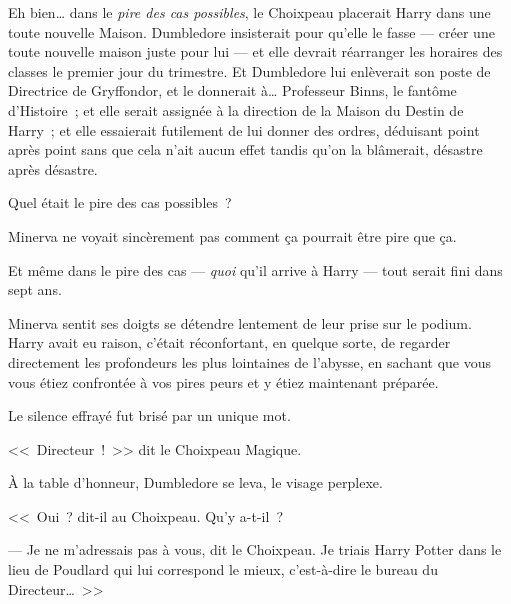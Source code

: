 Eh bien… dans le \emph{pire des cas possibles}, le Choixpeau placerait Harry dans une toute nouvelle Maison. Dumbledore insisterait pour qu'elle le fasse — créer une toute nouvelle maison juste pour lui — et elle devrait réarranger les horaires des classes le premier jour du trimestre. Et Dumbledore lui enlèverait son poste de Directrice de Gryffondor, et le donnerait à… Professeur Binns, le fantôme d'Histoire~; et elle serait assignée à la direction de la Maison du Destin de Harry~; et elle essaierait futilement de lui donner des ordres, déduisant point après point sans que cela n'ait aucun effet tandis qu'on la blâmerait, désastre après désastre.

Quel était le pire des cas possibles~?

Minerva ne voyait sincèrement pas comment ça pourrait être pire que ça.

Et même dans le pire des cas — \emph{quoi} qu'il arrive à Harry — tout serait fini dans sept ans.

Minerva sentit ses doigts se détendre lentement de leur prise sur le podium. Harry avait eu raison, c'était réconfortant, en quelque sorte, de regarder directement les profondeurs les plus lointaines de l'abysse, en sachant que vous vous étiez confrontée à vos pires peurs et y étiez maintenant préparée.

Le silence effrayé fut brisé par un unique mot.

<<~Directeur~!~>> dit le Choixpeau Magique.

À la table d'honneur, Dumbledore se leva, le visage perplexe.

<<~Oui~? dit-il au Choixpeau. Qu'y a-t-il~?

--- Je ne m'adressais pas à vous, dit le Choixpeau. Je triais Harry Potter dans le lieu de Poudlard qui lui correspond le mieux, c'est-à-dire le bureau du Directeur…~>>

